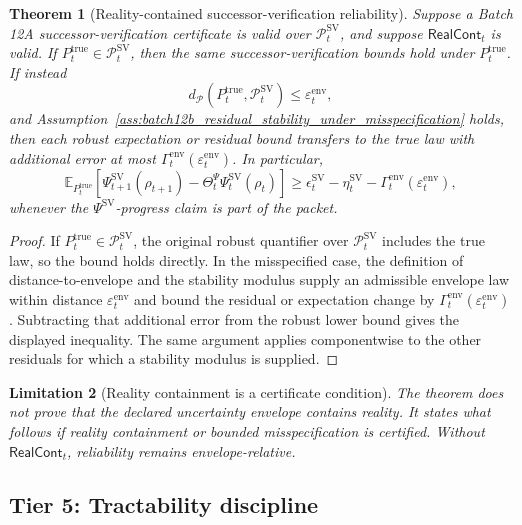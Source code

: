 \documentclass[11pt]{article}
\newtheorem{theorem}{Theorem}[section]
\newtheorem{limitation}[theorem]{Limitation}
\newcommand{\Pcal}{\mathcal{P}}
\newcommand{\1}{\mathbf{1}}
\providecommand{\true}{\mathrm{true}}
\begin{document}
\begin{theorem}[Reality-contained successor-verification reliability]
\label{thm:batch12b_reality_contained_sv_reliability}
Suppose a Batch 12A successor-verification certificate is valid over \(\Pcal_t^{\mathrm{SV}}\), and suppose \(\mathsf{RealCont}_t\) is valid.  If \(P_t^{\true}\in\Pcal_t^{\mathrm{SV}}\), then the same successor-verification bounds hold under \(P_t^{\true}\).  If instead
\[
d_{\Pcal}(P_t^{\true},\Pcal_t^{\mathrm{SV}})\le\varepsilon_t^{\mathrm{env}},
\]
and Assumption~\ref{ass:batch12b_residual_stability_under_misspecification} holds, then each robust expectation or residual bound transfers to the true law with additional error at most \(\Gamma_t^{\mathrm{env}}(\varepsilon_t^{\mathrm{env}})\).  In particular,
\[
\mathbb E_{P_t^{\true}}
\left[
\Psi_{t+1}^{\mathrm{SV}}(\rho_{t+1})-
\Theta_t^{\Psi}\Psi_t^{\mathrm{SV}}(\rho_t)
\right]
\ge
\epsilon_t^{\mathrm{SV}}-
\eta_t^{\mathrm{SV}}-
\Gamma_t^{\mathrm{env}}(\varepsilon_t^{\mathrm{env}}),
\]
whenever the \(\Psi^{\mathrm{SV}}\)-progress claim is part of the packet.
\end{theorem}

\begin{proof}
If \(P_t^{\true}\in\Pcal_t^{\mathrm{SV}}\), the original robust quantifier over \(\Pcal_t^{\mathrm{SV}}\) includes the true law, so the bound holds directly.  In the misspecified case, the definition of distance-to-envelope and the stability modulus supply an admissible envelope law within distance \(\varepsilon_t^{\mathrm{env}}\) and bound the residual or expectation change by \(\Gamma_t^{\mathrm{env}}(\varepsilon_t^{\mathrm{env}})\).  Subtracting that additional error from the robust lower bound gives the displayed inequality.  The same argument applies componentwise to the other residuals for which a stability modulus is supplied.
\end{proof}

\begin{limitation}[Reality containment is a certificate condition]
\label{lim:batch12b_reality_containment_condition}
The theorem does not prove that the declared uncertainty envelope contains reality.  It states what follows if reality containment or bounded misspecification is certified.  Without \(\mathsf{RealCont}_t\), reliability remains envelope-relative.
\end{limitation}

\subsection{Tier 5: Tractability discipline}
\end{document}
